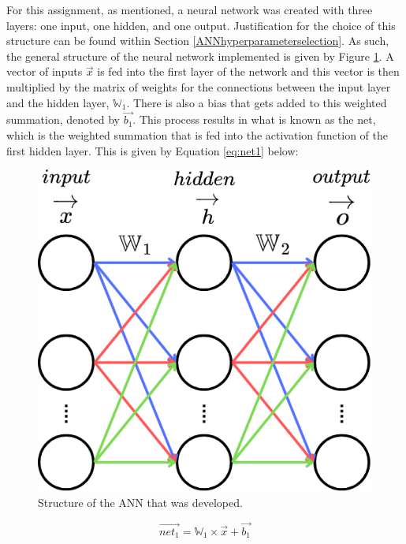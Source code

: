 \documentclass[a4paper]{article}
\begin{document}
For this assignment, as mentioned, a neural network was created with three layers: one input, one hidden, and one output. Justification for the choice of this structure can be found within Section \ref{ANNhyperparameterselection}. As such, the general structure of the neural network implemented is given by Figure \ref{fig:annstructure}. A vector of inputs $\overrightarrow{x}$ is fed into the first layer of the network and this vector is then multiplied by the matrix of weights for the connections between the input layer and the hidden layer, $\mathbb W_1$. There is also a bias that gets added to this weighted summation, denoted by $\overrightarrow{b_1}$. This process results in what is known as the net, which is the weighted summation that is fed into the activation function of the first hidden layer. This is given by Equation \ref{eq:net1} below:

\begin{figure}[h!]
    \centering
    \includegraphics[scale = 0.5]{images/annstructure.png}
    \caption{Structure of the ANN that was developed.}
    \label{fig:annstructure}
\end{figure}

\begin{equation}
    \label{eq:net1}
    \overrightarrow{net_{1}} = \mathbb W_{1} \times \overrightarrow{x} + \overrightarrow{b_1}
\end{equation}
\end{document}
